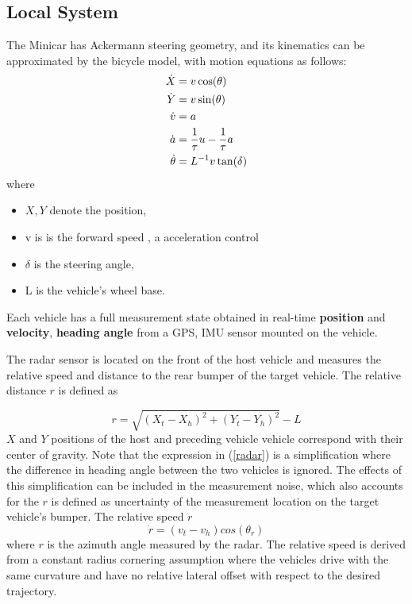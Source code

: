 \documentclass[letterpaper, 10pt, conference]{ieeeconf}  %
\def\eqref#1{(\ref{#1})}
\begin{document}
\subsection{Local System}
The Minicar has Ackermann steering geometry, and its kinematics can be approximated by the bicycle model, with motion equations as follows:
\begin{align} \label{diff_1_LPV}
    \dot{X} &= v \cos(\theta) \\ \notag
    \dot{Y} &= v \sin(\theta)\\ \notag
    \dot{v} &= a \\ \notag
    \dot{a} &= \frac{1}{\tau}u - \frac{1}{\tau}a  \\ \notag
     \dot{\theta} &= L^{-1} v \tan(\delta)  \\
\end{align}
where
\begin{itemize}
    \item $X , Y$ denote the position,
    \item v is is the forward speed , a acceleration control 
    \item $\delta $ is the steering angle,
    \item L is the vehicle's wheel base. 
\end{itemize}

Each vehicle has a full measurement state obtained in real-time \textbf{position} and \textbf{velocity}, \textbf{heading angle} from a GPS, IMU sensor mounted on the vehicle. 

The radar sensor is located on the front of the
 host vehicle and measures the relative speed and distance to the rear bumper of the target
 vehicle. The relative distance $r$ is defined as

\begin{equation}\label{radar}
    r = \sqrt{(X_t - X_h)^2 + (Y_t - Y_h)^2} - L 
\end{equation}
$X$ and $Y$ positions of the host and preceding vehicle vehicle
 correspond with their center of gravity. Note that the expression in \eqref{radar} is a simplification
 where the difference in heading angle between the two vehicles is ignored. The effects of
 this simplification can be included in the measurement noise, which also accounts for the
 $r$ is defined as uncertainty of the measurement location on the target vehicle's bumper. The relative speed $\dot{r}$
 \begin{equation}\label{radar_speed}
     \dot{r} = (v_t - v_h) cos(\theta_r)
 \end{equation}
where $r$ is the azimuth angle measured by the radar. The relative speed is derived from a
 constant radius cornering assumption where the vehicles drive with the same curvature
 and have no relative lateral offset with respect to the desired trajectory.
\end{document}
